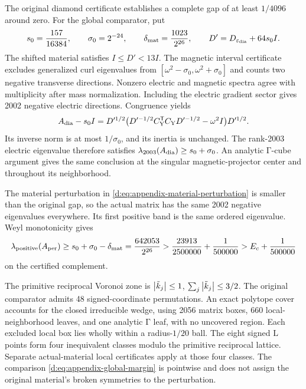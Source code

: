The original diamond certificate establishes a complete gap of at least
\(1/4096\) around zero. For the global comparator, put
\[
 s_0=\frac{157}{16384},\qquad
 \sigma_0=2^{-24},\qquad
 \delta_{\rm mat}=\frac{1023}{2^{26}},\qquad
 D'=D_{\varepsilon_{\rm dia}}+64s_0I.
\]
The shifted material satisfies \(I\le D'<13I\).
The magnetic interval certificate excludes generalized curl eigenvalues
from \([\omega^2-\sigma_0,\omega^2+\sigma_0]\) and counts two negative transverse
directions. Nonzero electric and magnetic spectra agree with
multiplicity after mass normalization. Including the electric gradient
sector gives 2002 negative electric directions. Congruence yields
\[
 A_{\rm dia}-s_0I
 =D'^{1/2}
  \bigl(D'^{-1/2}C_{\rm Y}^{\mathsf T}C_{\rm Y}D'^{-1/2}-\omega^2I\bigr)D'^{1/2}.
\]
Its inverse norm is at most \(1/\sigma_0\), and its inertia is unchanged.
The rank-2003 electric eigenvalue therefore satisfies
\(\lambda_{2003}(A_{\rm dia})\ge s_0+\sigma_0\).
An analytic \(\mathrm{\Gamma}\)-cube argument gives the same conclusion at the
singular magnetic-projector center and throughout its neighborhood.

The material perturbation in \eqref{d:eq:appendix-material-perturbation}
is smaller than the original gap, so the actual matrix has the same
2002 negative eigenvalues everywhere. Its first positive band is the
same ordered eigenvalue. Weyl monotonicity gives
\begin{equation}
 \lambda_{\mathrm{positive}}(A_{\rm per})
 \ge s_0+\sigma_0-\delta_{\rm mat}
 =\frac{642053}{2^{26}}
 >\frac{23913}{2500000}+\frac1{500000}
 >E_c+\frac1{500000}
 \label{d:eq:appendix-global-margin}
\end{equation}
on the certified complement.

The primitive reciprocal Voronoi zone is
\(\left\lvert \tilde k_j\right\rvert\le1\), \(\sum_j\left\lvert \tilde k_j\right\rvert\le3/2\).
The original comparator admits 48 signed-coordinate permutations.
An exact polytope cover accounts for the closed irreducible wedge,
using 2056 matrix boxes, 660 local-neighborhood leaves, and one analytic
\(\mathrm{\Gamma}\) leaf, with no uncovered region. Each excluded local box lies
wholly within a radius-\(1/20\) ball. The eight signed \(\mathrm{L}\) points form
four inequivalent classes modulo the primitive reciprocal lattice.
Separate actual-material local certificates apply at those four classes.
The comparison \eqref{d:eq:appendix-global-margin} is pointwise and does
not assign the original material's broken symmetries to the perturbation.

